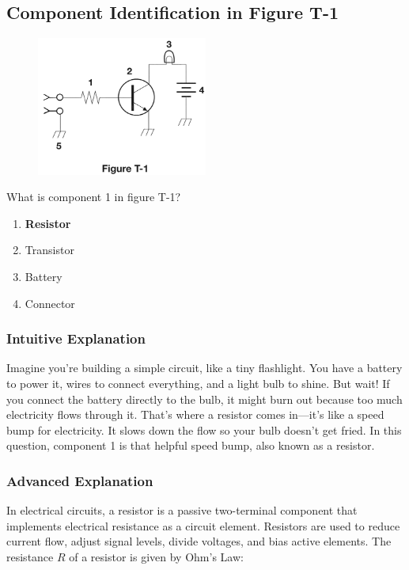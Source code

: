 \subsection{Component Identification in Figure T-1}
\label{T6C02}

\begin{figure}[th]
    \includegraphics[width=0.5\textwidth]{tech/images/t1.png} 
\end{figure}

\begin{tcolorbox}[colback=gray!10!white,colframe=black!75!black,title=T6C02]

What is component 1 in figure T-1?
\begin{enumerate}[label=\Alph*)]
    \item \textbf{Resistor}
    \item Transistor
    \item Battery
    \item Connector
\end{enumerate}
\end{tcolorbox}

\subsubsection{Intuitive Explanation}
Imagine you’re building a simple circuit, like a tiny flashlight. You have a battery to power it, wires to connect everything, and a light bulb to shine. But wait! If you connect the battery directly to the bulb, it might burn out because too much electricity flows through it. That’s where a resistor comes in—it’s like a speed bump for electricity. It slows down the flow so your bulb doesn’t get fried. In this question, component 1 is that helpful speed bump, also known as a resistor.

\subsubsection{Advanced Explanation}
In electrical circuits, a resistor is a passive two-terminal component that implements electrical resistance as a circuit element. Resistors are used to reduce current flow, adjust signal levels, divide voltages, and bias active elements. The resistance \( R \) of a resistor is given by Ohm's Law:

